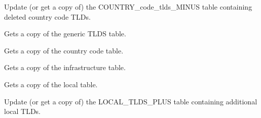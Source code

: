 \documentclass[letterpaper,10pt,english]{sphinxmanual}
\begin{document}
\begin{fulllineitems}
\begin{fulllineitems}
\begin{fulllineitems}

\pysigstartsignatures
{}
\pysigstopsignatures
\sphinxAtStartPar
Update (or get a copy of) the COUNTRY\_code\_tlds\_MINUS table containing deleted country code TLDs.

\end{fulllineitems}



\begin{fulllineitems}

\pysigstartsignatures
{}
\pysigstopsignatures
\sphinxAtStartPar
Gets a copy of the generic TLDS table.

\end{fulllineitems}



\begin{fulllineitems}

\pysigstartsignatures
{}
\pysigstopsignatures
\sphinxAtStartPar
Gets a copy of the country code table.

\end{fulllineitems}



\begin{fulllineitems}

\pysigstartsignatures
{}
\pysigstopsignatures
\sphinxAtStartPar
Gets a copy of the infrastructure table.

\end{fulllineitems}



\begin{fulllineitems}

\pysigstartsignatures
{}
\pysigstopsignatures
\sphinxAtStartPar
Gets a copy of the local table.

\end{fulllineitems}



\begin{fulllineitems}

\pysigstartsignatures
{}
\pysigstopsignatures
\sphinxAtStartPar
Update (or get a copy of) the LOCAL\_TLDS\_PLUS table containing additional local TLDs.


\end{fulllineitems}
\end{fulllineitems}
\end{fulllineitems}
\end{document}
